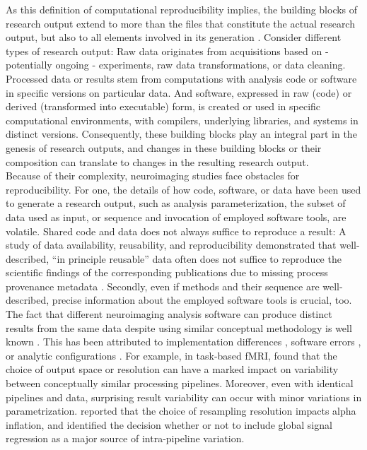 As this definition of computational reproducibility implies, the building blocks of research output extend to more than the files that constitute the actual research output, but also to all elements involved in its generation \citep{claerbout1992electronic}.
Consider different types of research output:
Raw data originates from acquisitions based on - potentially ongoing - experiments, raw data transformations, or data cleaning.
Processed data or results stem from computations with analysis code or software in specific versions on particular data.
And software, expressed in raw (code) or derived (transformed into executable) form, is created or used in specific computational environments, with compilers, underlying libraries, and systems in distinct versions.
Consequently, these building blocks play an integral part in the genesis of research outputs, and changes in these building blocks or their composition can translate to changes in the resulting research output.\\
Because of their complexity, neuroimaging studies face obstacles for reproducibility.
For one, the details of how code, software, or data have been used to generate a research output, such as analysis parameterization, the subset of data used as input, or sequence and invocation of employed software tools, are volatile.
Shared code and data does not always suffice to reproduce a result:
A study of data availability, reusability, and reproducibility demonstrated that well-described, ``in principle reusable'' data often does not suffice to reproduce the scientific findings of the corresponding publications due to  missing process provenance metadata \citep{hardwicke2018data}.
Secondly, even if methods and their sequence are well-described, precise information about the employed software tools is crucial, too.
The fact that different neuroimaging analysis software can produce distinct results from the same data despite using similar conceptual methodology is well known \citep{bowring2019exploring}.
This has been attributed to implementation differences \citep{palumbo2019evaluation}, software errors \citep{eklund2016cluster}, or analytic configurations \citep{pauli2016exploring}.
For example, in task-based fMRI, \citet{li2021moving} found that the choice of output space or resolution can have a marked impact on variability between conceptually similar processing pipelines.
Moreover, even with identical pipelines and data, surprising result variability can occur with minor variations in parametrization.
\citet{mueller2017commentary} reported that the choice of resampling resolution impacts alpha inflation, and \citet{li2021moving} identified the decision whether or not to include global signal regression as a major source of intra-pipeline variation.
